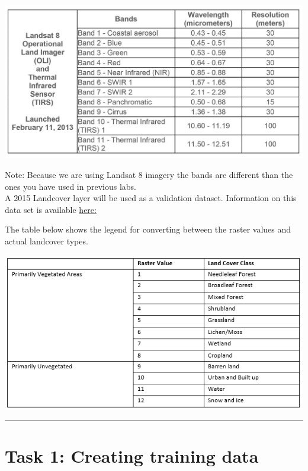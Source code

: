 \documentclass[
]{book}
\begin{document}
\begin{center}\includegraphics[width=1\linewidth]{images/08-landsat-designations} \end{center}

Note: Because we are using Landsat 8 imagery the bands are different than the ones you have used in previous labs.\\
A 2015 Landcover layer will be used as a validation dataset. Information on this data set is available \href{http://www.cec.org/north-american-environmental-atlas/land-cover-30m-2015-landsat-and-rapideye/}{here:}

The table below shows the legend for converting between the raster values and actual landcover types.

\begin{center}\includegraphics[width=1\linewidth]{images/08-raster-value-table} \end{center}

\begin{center}\rule{0.5\linewidth}{0.5pt}\end{center}

\hypertarget{task-1-creating-training-data}{%
\section*{Task 1: Creating training data}\label{task-1-creating-training-data}}
\end{document}
